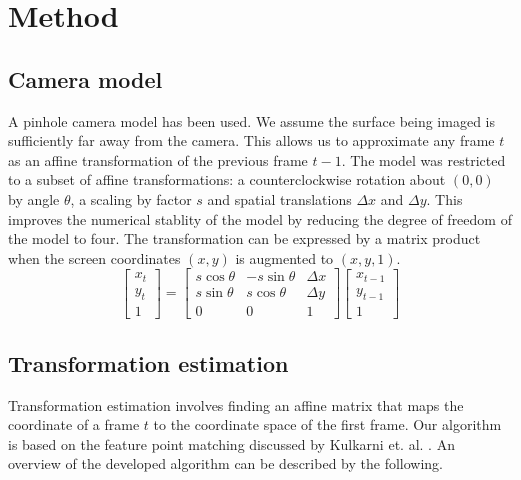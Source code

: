 \section{Method}
\subsection{Camera model}

A pinhole camera model has been used.
We assume the surface being imaged is sufficiently far away from the camera.
This allows us to approximate any frame $t$ as an affine transformation of the previous frame $t-1$.
The model was restricted to a subset of affine transformations:
a counterclockwise rotation about $(0,0)$ by angle $\theta$,
a scaling by factor $s$ 
and spatial translations $\Delta x$ and $\Delta y$.
This improves the numerical stablity of the model by reducing the degree of freedom of the model to four.
The transformation can be expressed by a matrix product when the screen coordinates $(x,y)$ is augmented to $(x,y,1)$.
\begin{equation}
  \begin{bmatrix}
    x_{t}\\
    y_{t}\\
		1
  \end{bmatrix}
  =
  \begin{bmatrix}
		s\cos\theta & -s\sin\theta & \Delta x \\
    s\sin\theta &  s\cos\theta & \Delta y \\
    0           &  0           & 1
  \end{bmatrix}
  \begin{bmatrix}
		x_{t-1} \\
		y_{t-1} \\
		1
  \end{bmatrix}
\end{equation}


\subsection{Transformation estimation}

Transformation estimation involves finding an affine matrix that maps the coordinate of a frame $t$ to the coordinate space of the first frame.
Our algorithm is based on the feature point matching discussed by Kulkarni et. al. \cite{Kulkarni2017}.
An overview of the developed algorithm can be described by the following.

\begin{algorithmic}
	\ENDFOR
	\ENDFOR
\end{algorithmic}

